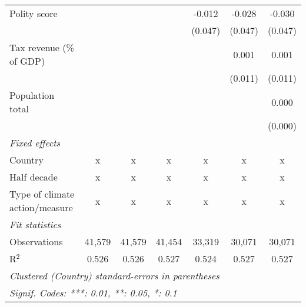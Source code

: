 \begin{tabular}{lcccccc}
   Polity score                                                 &             &               &                & -0.012        & -0.028        & -0.030\\   
                                                                &             &               &                & (0.047)       & (0.047)       & (0.047)\\   
   Tax revenue (\% of GDP)                                      &             &               &                &               & 0.001         & 0.001\\   
                                                                &             &               &                &               & (0.011)       & (0.011)\\   
   Population total                                             &             &               &                &               &               & 0.000\\   
                                                                &             &               &                &               &               & (0.000)\\   
   \emph{Fixed effects}\\
   Country                                                      & x           & x             & x              & x             & x             & x\\  
   Half decade                                                  & x           & x             & x              & x             & x             & x\\  
   Type of climate action/measure                               & x           & x             & x              & x             & x             & x\\  
   \midrule \emph{Fit statistics}\\
   Observations                                                 & 41,579      & 41,579        & 41,454         & 33,319        & 30,071        & 30,071\\  
   R$^2$                                                        & 0.526       & 0.526         & 0.527          & 0.524         & 0.527         & 0.527\\  
   \midrule
   \multicolumn{7}{l}{\emph{Clustered (Country) standard-errors in parentheses}}\\
   \multicolumn{7}{l}{\emph{Signif. Codes: ***: 0.01, **: 0.05, *: 0.1}}\\
\end{tabular}
\par\endgroup


